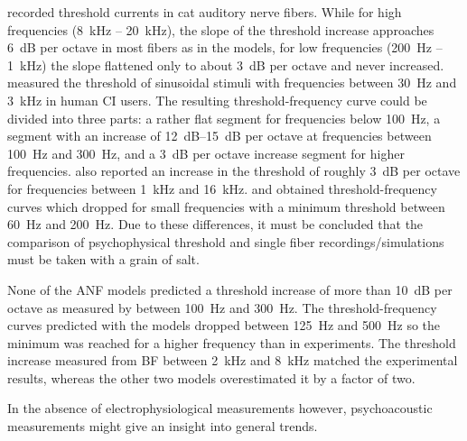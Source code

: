 \documentclass[utf8]{frontiersSCNS} %
\begin{document}
\cite{Dynes1992} recorded threshold currents in cat auditory nerve fibers. 
While for high frequencies (\SI{8}{\kilo\hertz} -- \SI{20}{\kilo\hertz}), the slope of the threshold increase approaches \SI{6}{dB} per octave in most fibers as in the models, for low frequencies (\SI{200}{\hertz} -- \SI{1}{\kilo\hertz}) the slope flattened only to about \SI{3}{dB} per octave and never increased.
\cite{Shannon1983} measured  the threshold of sinusoidal stimuli with frequencies between \SI{30}{\hertz} and \SI{3}{\kilo\hertz} in human CI users. The resulting threshold-frequency curve could be divided into three parts: a rather flat segment for frequencies below \SI{100}{\hertz}, a segment with an increase of \SIrange[range-units=single, range-phrase = --]{12}{15}{dB} per octave at frequencies between \SI{100}{\hertz} and \SI{300}{\hertz}, and a \SI{3}{dB} per octave increase segment for higher frequencies. \cite{Pfingst1988} also reported an increase in the threshold of roughly \SI{3}{dB} per octave for frequencies between \SI{1}{\kilo\hertz} and \SI{16}{\kilo\hertz}. \cite{Pfingst1988} and \cite{Pfingst1993} obtained threshold-frequency curves which dropped for small frequencies with a minimum threshold between \SI{60}{\hertz} and \SI{200}{\hertz}. Due to these differences, it must be concluded that the comparison of psychophysical threshold and single fiber recordings/simulations must be taken with a grain of salt. 

None of the ANF models predicted a threshold increase of more than \SI{10}{dB} per octave as measured by \cite{Shannon1983} between \SI{100}{\hertz} and \SI{300}{\hertz}. The threshold-frequency curves predicted with the models dropped between \SI{125}{\hertz} and \SI{500}{\hertz} so the minimum was reached for a higher frequency than in experiments. The threshold increase measured from BF between \SI{2}{\kilo\hertz} and \SI{8}{\kilo\hertz} matched the experimental results, whereas the other two models overestimated it by a factor of two. 

In the absence of electrophysiological measurements however, psychoacoustic measurements might give an insight into general trends.
\end{document}
